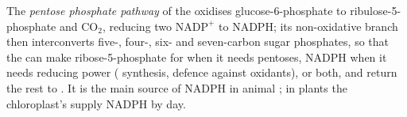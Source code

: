 \begin{definition}\label{def:b1:biosyntheses-integration:ppp}
The \emph{pentose phosphate pathway} of the  oxidises
glucose-6-phosphate to ribulose-5-phosphate and $\mathrm{CO_2}$,
reducing two $\mathrm{NADP^+}$ to NADPH; its non-oxidative branch then
interconverts five-, four-, six- and seven-carbon sugar phosphates, so
that the  can make ribose-5-phosphate for  when it needs
pentoses, NADPH when it needs reducing power ( synthesis, defence
against oxidants), or both, and return the rest to . It is
the main source of NADPH in animal ; in plants the chloroplast's
 supply NADPH by day.
\end{definition}

